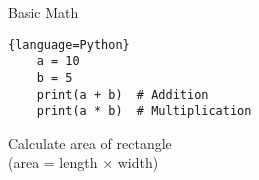 \begin{frame}[fragile]{Basic Math}
	\begin{lstlisting}{language=Python}
    a = 10
    b = 5
    print(a + b)  # Addition
    print(a * b)  # Multiplication
    \end{lstlisting}

	\pause
	Calculate area of rectangle \\
	(area = length × width)
\end{frame}